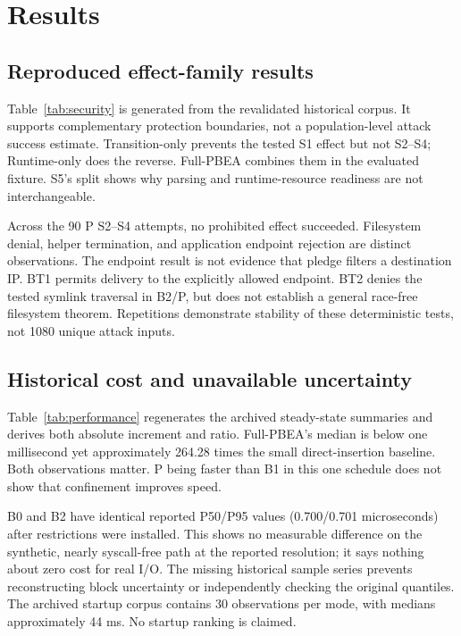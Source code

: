 \documentclass[electronics,article,submit,pdftex,moreauthors]{Definitions/mdpi}
\newcommand{\EvidenceDir}{../../results/204_Astra_review/generated}
\begin{document}
\section{Results}\label{sec:results}
\subsection{Reproduced effect-family results}
Table~\ref{tab:security} is generated from the revalidated historical corpus. It supports complementary protection boundaries, not a population-level attack success estimate. Transition-only prevents the tested S1 effect but not S2--S4; Runtime-only does the reverse. Full-PBEA combines them in the evaluated fixture. S5's split shows why parsing and runtime-resource readiness are not interchangeable.
\begin{table}[H]\caption{Historical results, as numerator/denominator. N/A excludes an absent fault point.}\label{tab:security}\centering

\end{table}

Across the 90 P S2--S4 attempts, no prohibited effect succeeded. Filesystem denial, helper termination, and application endpoint rejection are distinct observations. The endpoint result is not evidence that pledge filters a destination IP. BT1 permits delivery to the explicitly allowed endpoint. BT2 denies the tested symlink traversal in B2/P, but does not establish a general race-free filesystem theorem. Repetitions demonstrate stability of these deterministic tests, not 1080 unique attack inputs.

\subsection{Historical cost and unavailable uncertainty}
Table~\ref{tab:performance} regenerates the archived steady-state summaries and derives both absolute increment and ratio. Full-PBEA's median is below one millisecond yet approximately 264.28 times the small direct-insertion baseline. Both observations matter. P being faster than B1 in this one schedule does not show that confinement improves speed.
\begin{table}[H]\caption{Historical synthetic S0 summaries in microseconds; new independent-block measurements are a separate corpus.}\label{tab:performance}\centering

\end{table}

B0 and B2 have identical reported P50/P95 values (0.700/0.701 microseconds) after restrictions were installed. This shows no measurable difference on the synthetic, nearly syscall-free path at the reported resolution; it says nothing about zero cost for real I/O. The missing historical sample series prevents reconstructing block uncertainty or independently checking the original quantiles. The archived startup corpus contains 30 observations per mode, with medians approximately 44 ms. No startup ranking is claimed.
\end{document}
